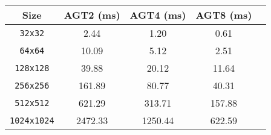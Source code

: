 {\small
\begin{tabular}{|c|c|c|c|c|}
    \hline Size & AGT2 (ms) & AGT4 (ms) & AGT8 (ms) \\
    \hline \verb|32x32| & 2.44 & 1.20 & 0.61 \\ 
    \verb|64x64| & 10.09 & 5.12 & 2.51 \\
    \verb|128x128| & 39.88 & 20.12 & 11.64 \\
    \verb|256x256| & 161.89 & 80.77 & 40.31 \\
    \verb|512x512| & 621.29 & 313.71 & 157.88 \\
    \verb|1024x1024| & 2472.33 & 1250.44 & 622.59 \\
    \hline
\end{tabular}}